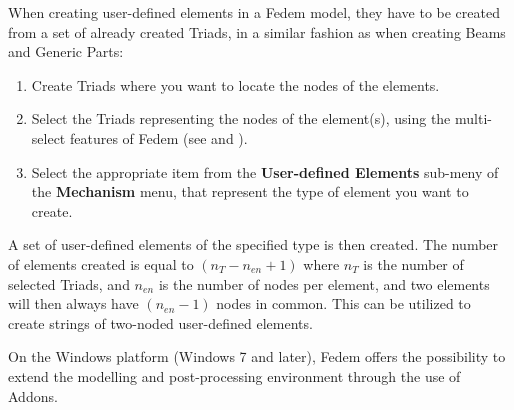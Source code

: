 When creating user-defined elements in a Fedem model, they have to be created
from a set of already created Triads, in a similar fashion as when creating
Beams and Generic Parts:

\begin{enumerate}
\item Create Triads where you want to locate the nodes of the elements.
\item Select the Triads representing the nodes of the element(s), using the
  multi-select features of Fedem (see
   and ).
\item Select the appropriate item from the \textbf{User-defined Elements}
  sub-meny of the \textbf{Mechanism} menu, that represent the type of element
  you want to create.
\end{enumerate}

\clearpage
A set of user-defined elements of the specified type is then created.
The number of elements created is equal to $(n_T-n_{en}+1)$ where $n_T$ is the
number of selected Triads, and $n_{en}$ is the number of nodes per element,
and two elements will then always have $(n_{en}-1)$ nodes in common.
This can be utilized to create strings of two-noded user-defined elements.




On the Windows platform (Windows 7 and later), Fedem offers the possibility to
extend the modelling and post-processing environment through the use of Addons.

